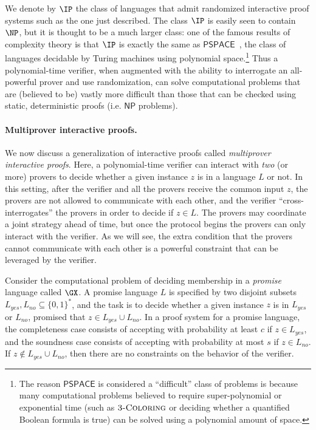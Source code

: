 We denote by $\IP$ the class of languages that admit randomized interactive proof systems such as the one just described. 
The class $\IP$ is easily seen to contain $\NP$, but it is thought to be a much larger class: one of the famous results of complexity theory is that $\IP$ is exactly the same as $\mathsf{PSPACE}$~\cite{lund1990algebraic,shamir1990ip}, the class of languages decidable by Turing machines using polynomial space.\footnote{The reason $\mathsf{PSPACE}$ is considered a ``difficult'' class of problems is because many computational problems believed to require super-polynomial or exponential time (such as $\textsc{3-Coloring}$ or deciding whether a quantified Boolean formula is true) can be solved using a polynomial amount of space.} Thus a polynomial-time verifier, when augmented with the ability to interrogate an all-powerful prover and use randomization, can solve computational problems that are (believed to be) vastly more difficult than those that can be checked using static, deterministic proofs (i.e. $\mathsf{NP}$ problems).

\paragraph{Multiprover interactive proofs.}
We now discuss a generalization of interactive proofs called \emph{multiprover interactive proofs}. Here, a polynomial-time verifier can interact with \emph{two} (or more) provers to decide whether a given instance $z$ is in a language $L$ or not. In this setting, after the verifier and all the provers receive the common input $z$, the provers are not allowed to communicate with each other, and the verifier ``cross-interrogates'' the provers in order to decide if $z \in L$. The provers may coordinate a joint strategy ahead of time, but once the protocol begins the provers can only interact with the verifier. As we will see, the extra condition that the provers cannot communicate with each other is a powerful constraint that can be leveraged by the verifier.





Consider the computational problem of deciding membership in a \emph{promise} language called $\GX$. 
A promise language $L$ is specified by two disjoint subsets $L_{yes},L_{no}\subseteq\{0,1\}^*$, and the task is to decide whether a given instance $z$ is in $L_{yes}$ or $L_{no}$, promised that $z \in L_{yes} \cup L_{no}$. In a proof system for a promise language, the completeness case consists of accepting with probability at least $c$ if $z \in L_{yes}$, and the soundness case consists of accepting with probability at most $s$ if $z \in L_{no}$. If $z \notin L_{yes} \cup L_{no}$, then there are no constraints on the behavior of the verifier.







